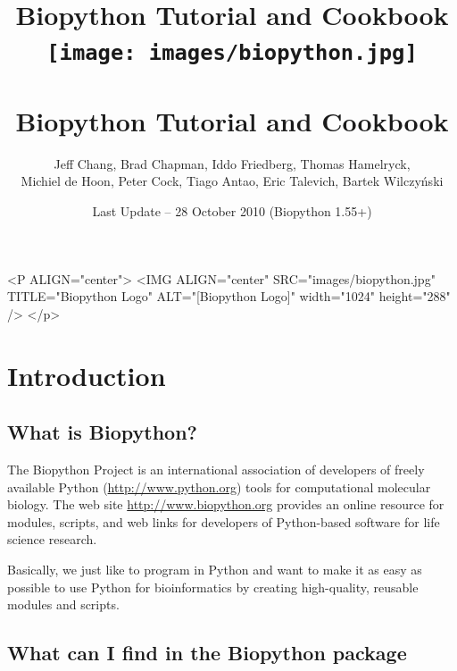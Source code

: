\documentclass{report}
\begin{document}
\begin{htmlonly}
\title{Biopython Tutorial and Cookbook}
\end{htmlonly}
\begin{latexonly}
\title{
\texttt{[image: images/biopython.jpg]}\\
~\\
Biopython Tutorial and Cookbook}
\end{latexonly}

\author{Jeff Chang, Brad Chapman, Iddo Friedberg, Thomas Hamelryck, \\
Michiel de Hoon, Peter Cock, Tiago Antao, Eric Talevich, Bartek Wilczy\'{n}ski}
\date{Last Update -- 28 October 2010 (Biopython 1.55+)}

\begin{rawhtml}
<P ALIGN="center">
<IMG ALIGN="center" SRC="images/biopython.jpg" TITLE="Biopython Logo" ALT="[Biopython Logo]" width="1024" height="288" />
</p>
\end{rawhtml}

\maketitle
\tableofcontents

\chapter{Introduction}
\label{chapter:introduction}

\section{What is Biopython?}

The Biopython Project is an international association of developers of freely available Python (\url{http://www.python.org}) tools for computational molecular biology. The web site \url{http://www.biopython.org} provides an online resource for modules, scripts, and web links for developers of Python-based software for life science research.

Basically, we just like to program in Python and want to make it as easy as possible to use Python for bioinformatics by creating high-quality, reusable modules and scripts.

\section{What can I find in the Biopython package}
\end{document}

